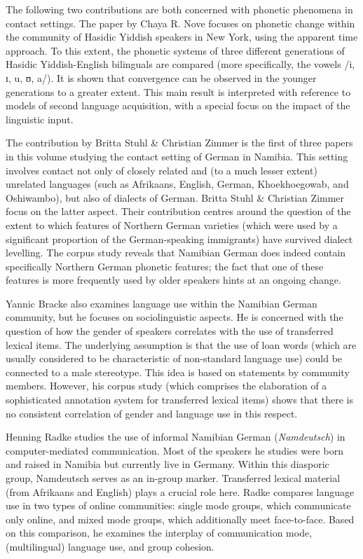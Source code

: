 \documentclass[output=paper]{langsci/langscibook}
\begin{document}
The following two contributions are both concerned with phonetic phenomena in contact settings. The paper by {Chaya} {R.} {Nove} focuses on phonetic change within the community of Hasidic Yiddish speakers in New York, using the apparent time approach. To this extent, the phonetic systems of three different generations of Hasidic Yiddish-English bilinguals are compared (more specifically, the vowels /i, ɪ, u, ʊ, a/). It is shown that convergence can be observed in the younger generations to a greater extent. This main result is interpreted with reference to models of second language acquisition, with a special focus on the impact of the linguistic input.

The contribution by {Britta} {Stuhl} {\&} {Christian} {Zimmer} is the first of three papers in this volume studying the contact setting of German in Namibia. This setting involves contact not only of closely related and (to a much lesser extent) unrelated languages (such as Afrikaans, English, German, Khoekhoegowab, and Oshiwambo), but also of dialects of German. Britta Stuhl {\&} {Christian} {Zimmer} focus on the latter aspect. Their contribution centres around the question of the extent to which features of Northern German varieties (which were used by a significant proportion of the German-speaking immigrants) have survived dialect levelling. The corpus study reveals that Namibian German does indeed contain specifically Northern German phonetic features; the fact that one of these features is more frequently used by older speakers hints at an ongoing change. 

{Yannic} {Bracke} also examines language use within the Namibian German community, but he focuses on sociolinguistic aspects. He is concerned with the question of how the gender of speakers correlates with the use of transferred lexical items. The underlying assumption is that the use of loan words (which are usually considered to be characteristic of non-standard language use) could be connected to a male stereotype. This idea is based on statements by community members. However, his corpus study (which comprises the elaboration of a sophisticated annotation system for transferred lexical items) shows that there is no consistent correlation of gender and language use in this respect. 

{Henning} {Radke} studies the use of informal Namibian German (\textit{Namdeutsch}) in computer-mediated communication. Most of the speakers he studies were born and raised in Namibia but currently live in Germany. Within this diasporic group, Namdeutsch serves as an in-group marker. Transferred lexical material (from Afrikaans and English) plays a crucial role here. Radke compares language use in two types of online communities: single mode groups, which communicate only online, and mixed mode groups, which additionally meet face-to-face. Based on this comparison, he examines the interplay of communication mode, (multilingual) language use, and group cohesion.
\end{document}
